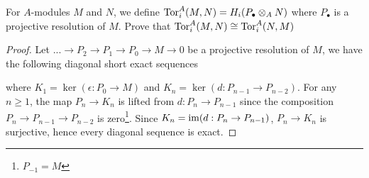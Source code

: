 \begin{problem}[problem 4]
	For $A$-modules $M$ and $N$, we define $\operatorname{Tor}_i^A(M, N) = H_i(P_\bullet \otimes_A N)$ where $P_\bullet$ is a projective resolution of $M$. Prove that $\operatorname{Tor}_i^A(M, N) \cong \operatorname{Tor}_i^A(N, M)$
\end{problem}

\begin{proof}
	Let $... \to P_2 \to P_1 \to P_0 \to M \to 0$ be a projective resolution of $M$, we have the following diagonal short exact sequences
	\begin{center}
	\end{center}
	
	where $K_1 = \ker (\epsilon: P_0 \to M)$ and $K_n = \ker (d: P_{n-1} \to P_{n-2})$. For any $n \geq 1$, the map $P_n \to K_n$ is lifted from $d: P_n \to P_{n-1}$ since the composition $P_n \to P_{n-1} \to P_{n-2}$  is zero\footnote{$P_{-1} = M$}. Since $K_n = \operatorname{im} (d: P_n \to P_{n-1})$, $P_n \to K_n$ is surjective, hence every diagonal sequence is exact.
	

\end{proof}

